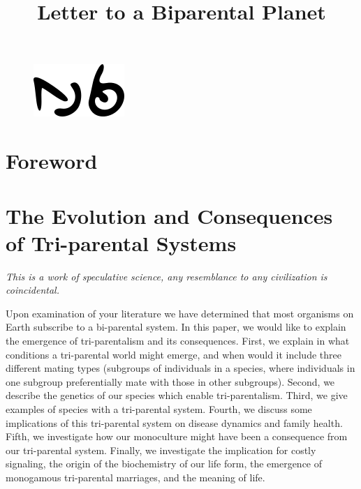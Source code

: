 \documentclass{report}
\begin{document}
\title{Letter to a Biparental Planet}



\begin{figure}[H]
\centering
\includegraphics[width=0.1\columnwidth]{AshleyFig/aliens.png}
\end{figure}

\maketitle



\chapter*{Foreword}


\chapter*{The Evolution and Consequences of Tri-parental Systems}


\textit{This is a work of speculative science, any resemblance to any civilization is coincidental.}
\vspace{12pt}


Upon examination of your literature we have determined that most organisms on Earth subscribe to a bi-parental system. In this paper, we would like to explain the emergence of tri-parentalism and its consequences. First, we explain in what conditions a tri-parental world might emerge, and when would it include three different mating types (subgroups of individuals in a species, where individuals in one subgroup preferentially mate with those in other subgroups). Second, we describe the genetics of our species which enable tri-parentalism. Third, we give examples of species with a tri-parental system. Fourth, we discuss some implications of this tri-parental system on disease dynamics and family health. Fifth, we investigate how our monoculture might have been a consequence from our tri-parental system. Finally, we investigate the implication for costly signaling, the origin of the biochemistry of our life form, the emergence of monogamous tri-parental marriages, and the meaning of life. 
\end{document}
